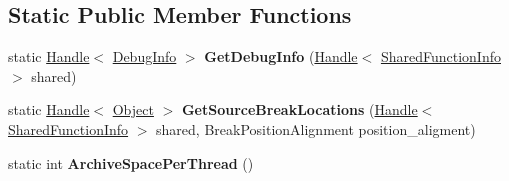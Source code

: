 \subsection*{Static Public Member Functions}
\begin{DoxyCompactItemize}
\item 
static \hyperlink{classv8_1_1internal_1_1_handle}{Handle}$<$ \hyperlink{classv8_1_1internal_1_1_debug_info}{Debug\+Info} $>$ {\bfseries Get\+Debug\+Info} (\hyperlink{classv8_1_1internal_1_1_handle}{Handle}$<$ \hyperlink{classv8_1_1internal_1_1_shared_function_info}{Shared\+Function\+Info} $>$ shared)\hypertarget{classv8_1_1internal_1_1_debug_a2683e6ec626918b930f1f12c92256886}{}\label{classv8_1_1internal_1_1_debug_a2683e6ec626918b930f1f12c92256886}

\item 
static \hyperlink{classv8_1_1internal_1_1_handle}{Handle}$<$ \hyperlink{classv8_1_1internal_1_1_object}{Object} $>$ {\bfseries Get\+Source\+Break\+Locations} (\hyperlink{classv8_1_1internal_1_1_handle}{Handle}$<$ \hyperlink{classv8_1_1internal_1_1_shared_function_info}{Shared\+Function\+Info} $>$ shared, Break\+Position\+Alignment position\+\_\+aligment)\hypertarget{classv8_1_1internal_1_1_debug_a8f37369d2f082eee77b87b25df95c037}{}\label{classv8_1_1internal_1_1_debug_a8f37369d2f082eee77b87b25df95c037}

\item 
static int {\bfseries Archive\+Space\+Per\+Thread} ()\hypertarget{classv8_1_1internal_1_1_debug_adb09bdbce4e9edfc915eef0b59574825}{}\label{classv8_1_1internal_1_1_debug_adb09bdbce4e9edfc915eef0b59574825}

\end{DoxyCompactItemize}
